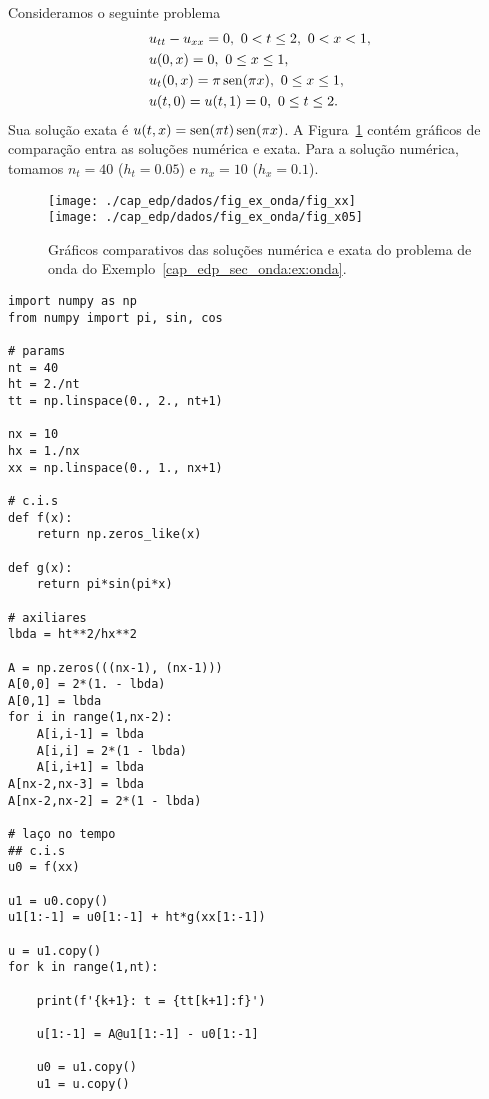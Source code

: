 \begin{ex}\label{cap_edp_sec_onda:ex:onda}
  Consideramos o seguinte problema
  \begin{subequations}
    \begin{align}
      &u_{tt} - u_{xx} = 0, ~0 < t \leq 2, ~0< x < 1,\\
      &u(0,x) = 0, ~0\leq x \leq 1,\\
      &u_t(0,x) = \pi\operatorname{sen}(\pi x), ~0\leq x \leq 1,\\
      &u(t,0) = u(t,1) = 0, ~0\leq t \leq 2.
    \end{align}
  \end{subequations}
  Sua solução exata é $u(t,x) = \operatorname{sen}(\pi t)\operatorname{sen}(\pi x)$. A Figura~\ref{cap_edp_sec_onda:fig:ex} contém gráficos de comparação entra as soluções numérica e exata. Para a solução numérica, tomamos $n_t = 40$ ($h_t=0.05$) e $n_x = 10$ ($h_x = 0.1$).

\begin{figure}[H]
  \centering
  \texttt{[image: ./cap\_edp/dados/fig\_ex\_onda/fig\_xx]}\\
  \texttt{[image: ./cap\_edp/dados/fig\_ex\_onda/fig\_x05]}\\
  \caption{Gráficos comparativos das soluções numérica e exata do problema de onda do Exemplo~\ref{cap_edp_sec_onda:ex:onda}.}
  \label{cap_edp_sec_onda:fig:ex}
\end{figure}

\begin{lstlisting}
import numpy as np
from numpy import pi, sin, cos

# params
nt = 40
ht = 2./nt
tt = np.linspace(0., 2., nt+1)

nx = 10
hx = 1./nx
xx = np.linspace(0., 1., nx+1)

# c.i.s
def f(x):
    return np.zeros_like(x)

def g(x):
    return pi*sin(pi*x)

# axiliares
lbda = ht**2/hx**2

A = np.zeros(((nx-1), (nx-1)))
A[0,0] = 2*(1. - lbda)
A[0,1] = lbda
for i in range(1,nx-2):
    A[i,i-1] = lbda
    A[i,i] = 2*(1 - lbda)
    A[i,i+1] = lbda
A[nx-2,nx-3] = lbda
A[nx-2,nx-2] = 2*(1 - lbda)

# laço no tempo
## c.i.s
u0 = f(xx)

u1 = u0.copy()
u1[1:-1] = u0[1:-1] + ht*g(xx[1:-1])

u = u1.copy()
for k in range(1,nt):
    
    print(f'{k+1}: t = {tt[k+1]:f}')

    u[1:-1] = A@u1[1:-1] - u0[1:-1]

    u0 = u1.copy()
    u1 = u.copy()
\end{lstlisting}
\end{ex}

